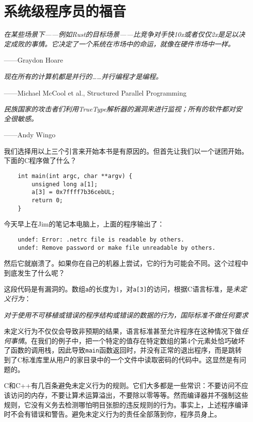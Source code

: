 \chapter{系统级程序员的福音}\label{ch01}
\emph{在某些场景下——例如Rust的目标场景——比竞争对手快10x或者仅仅2x是足以决定成败的事情。它决定了一个系统在市场中的命运，就像在硬件市场中一样。}
\begin{flushright}
    ——Graydon Hoare
\end{flushright}

\emph{现在所有的计算机都是并行的……并行编程才是编程。}
\begin{flushright}
    ——Michael McCool et al., Structured Parallel Programming    
\end{flushright}

\emph{民族国家的攻击者们利用TrueType解析器的漏洞来进行监视；所有的软件都对安全很敏感。}
\begin{flushright}
    ——Andy Wingo
\end{flushright}

我们选择用以上三个引言来开始本书是有原因的。但首先让我们以一个谜团开始。下面的C程序做了什么？
\begin{verbatim}
    int main(int argc, char **argv) {
        unsigned long a[1];
        a[3] = 0x7ffff7b36cebUL;
        return 0;
    }
\end{verbatim}

今天早上在Jim的笔记本电脑上，上面的程序输出了：
\begin{verbatim}
    undef: Error: .netrc file is readable by others.
    undef: Remove password or make file unreadable by others.
\end{verbatim}
然后它就崩溃了。如果你在自己的机器上尝试，它的行为可能会不同。这个过程中到底发生了什么呢？

这段代码是有漏洞的。数组\texttt{a}的长度为1，对\texttt{a[3]}的访问，根据C语言标准，是\emph{未定义行为}：

\emph{对于使用不可移植或错误的程序结构或错误的数据的行为，国际标准不做任何要求}

未定义行为不仅仅会导致非预期的结果，语言标准甚至允许程序在这种情况下做\emph{任何事情}。在我们的例子中，把一个特定的值存在特定数组的第4个元素处恰巧破坏了函数的调用栈，因此导致\texttt{main}函数返回时，并没有正常的退出程序，而是跳转到了C标准库里从用户的家目录中的一个文件中读取密码的代码中。这显然是有问题的。

C和C++有几百条避免未定义行为的规则。它们大多都是一些常识：不要访问不应该访问的内存，不要让算术运算溢出，不要除以零等等。然而编译器并不强制这些规则，它没有义务去检测哪怕明目张胆的违反规则的行为。事实上，上述程序编译时不会有错误和警告。避免未定义行为的责任全部落到你，程序员身上。

